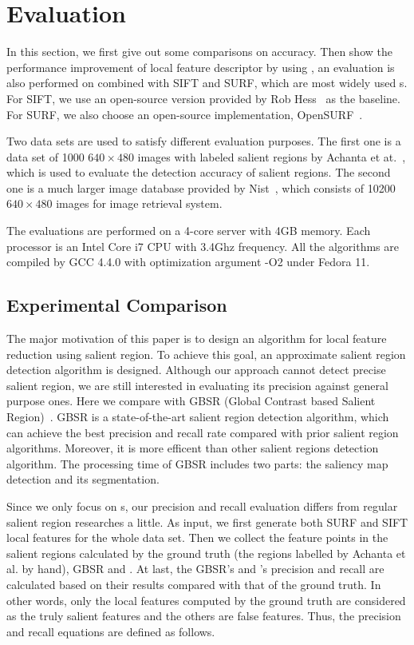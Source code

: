 \section{Evaluation}
\label{sec:evaluation}

In this section, we first give out some comparisons on accuracy. Then show the performance improvement of local feature descriptor by using {\sys}, an evaluation is also performed on {\sys} combined with SIFT and SURF, which are most widely used {\lfea}s. For SIFT, we use an open-source version provided by Rob Hess~\cite{hess2010opensift} as the baseline. For SURF, we also choose an open-source implementation, OpenSURF~\cite{evans2009notes}.

Two data sets are used to satisfy different evaluation purposes.  The first one is a data set of 1000 $640\times480$ images with labeled salient regions by Achanta et at.~\cite{achanta2009frequency}, which is used to evaluate the detection accuracy of salient regions. The second one is a much larger image database provided by Nist~\cite{nister2006scalable}, which consists of 10200 $640\times480$ images for image retrieval system.

The evaluations are performed on a 4-core server with 4GB memory. Each processor is an Intel Core i7 CPU with 3.4Ghz frequency. All the algorithms are compiled by GCC 4.4.0 with optimization argument -O2 under Fedora 11.



\subsection{Experimental Comparison}
\label{sec:evaluation_comparison}

The major motivation of this paper is to design an algorithm for local feature reduction using salient region. To achieve this goal, an approximate salient region detection algorithm is designed. Although our approach cannot detect precise salient region, we are still interested in evaluating its precision against general purpose ones. Here we compare {\sys} with GBSR (Global Contrast based Salient Region)~\cite{cheng2011global}. GBSR is a state-of-the-art salient region detection algorithm, which can achieve the best precision and recall rate compared with prior salient region algorithms. Moreover, it is more efficent than other salient regions detection algorithm. The processing time of GBSR includes two parts: the saliency map detection and its segmentation.

Since we only focus on {\lfea}s, our precision and recall evaluation differs from regular salient region researches a little. As input, we first generate both SURF and SIFT local features for the whole data set. Then we collect the feature points in the salient regions calculated by the ground truth (the regions labelled by Achanta et al. by hand), GBSR and {\sys}. At last, the GBSR's and {\sys}'s precision and recall are calculated based on their results compared with that of the ground truth. In other words, only the local features computed by the ground truth are considered as the truly salient features and the others are false features. Thus, the precision and recall equations are defined as follows.


